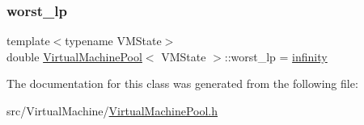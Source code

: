 \mbox{\label{class_virtual_machine_pool_ac5ffa14dc0e298c9fae3cddfa04779bb}} 
\subsubsection{\texorpdfstring{worst\+\_\+lp}{worst\_lp}}
{\footnotesize\ttfamily template$<$typename V\+M\+State$>$ \\
double \hyperlink{class_virtual_machine_pool}{Virtual\+Machine\+Pool}$<$ V\+M\+State $>$\+::worst\+\_\+lp = \hyperlink{_numerics_8h_a1bb1e42ae1b40cad6e99da0aab8a5576}{infinity}}



The documentation for this class was generated from the following file\+:\begin{DoxyCompactItemize}
\item 
src/\+Virtual\+Machine/\hyperlink{_virtual_machine_pool_8h}{Virtual\+Machine\+Pool.\+h}\end{DoxyCompactItemize}
